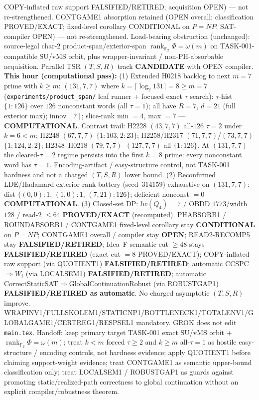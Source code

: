\documentclass[11pt]{article}
\begin{document}
COPY-inflated raw support FALSIFIED/RETIRED; acquisition OPEN) --- not re-strengthened.
CONTGAME1 absorption retained (OPEN overall; classification PROVED/EXACT;
fixed-level corollary CONDITIONAL on $P=NP$; SAT-compiler OPEN) --- not re-strengthened.
Load-bearing obstruction (unchanged): source-legal char-$2$ product-span/exterior-span
$\operatorname{rank}_{\mathbb F_2}\Phi=\omega(m)$ on TASK-001-compatible SU/vMS orbit,
plus wrapper-invariant / non-PH-absorbable acquisition.
Parallel TSR $(T,S,R)$ track \textbf{CANDIDATE} with OPEN compiler.
\textbf{This hour (computational pass):}
(1) Extended H0218 backlog to next $m{=}7$ prime with $k{\ge}m$:
$(131,7,7)$ where $k=\lceil\log_2 131\rceil=8{\ge}m{=}7$
(\texttt{experiments/product\_span/} leaf runner + focused exact $\tau$ search):
$\tau$-hist $\{1{:}126\}$ over $126$ nonconstant words (all $\tau{=}1$);
all have $R{=}7$, $d{=}21$ (full exterior max); innov $[7]$;
slice-rank min $=4$, max $=7$ --- \textbf{COMPUTATIONAL}.
Contrast trail: H2228 $(43,7,7)$ all-$126$ $\tau{=}2$ under $k{=}6{<}m$;
H2248 $(67,7,7)$ $\{1{:}103,2{:}23\}$; H2258/H2317 $(71,7,7)$/$(73,7,7)$ $\{1{:}124,2{:}2\}$;
H2348--H0218 $(79,7,7)$--$(127,7,7)$ all $\{1{:}126\}$.
At $(131,7,7)$ the cleared-$\tau{=}2$ regime persists into the first $k{=}8$ prime:
every nonconstant word has $\tau{=}1$. Encoding-artifact / easy-structure control,
not TASK-001 hardness and not a charged $(T,S,R)$ lower bound.
(2) Reconfirmed LDE/Hadamard exterior-rank battery (seed~$314159$) exhaustive on
$(131,7,7)$: dist $\{(0,0){:}1,\,(1,0){:}1,\,(7,21){:}126\}$; deficient nonconst $=0$ ---
\textbf{COMPUTATIONAL}.
(3) Closed-set DP: $lw(Q_4)=7$ / OBDD $1773$/width $128$ / read-$2$ $\le64$
\textbf{PROVED/EXACT} (recomputed).
PHABSORB1 / ROUNDABSORB1 / CONTGAME1 fixed-level corollary stay \textbf{CONDITIONAL} on $P=NP$;
CONTGAME1 overall / compiler stay \textbf{OPEN}; READ2-RECOMP5 stay \textbf{FALSIFIED/RETIRED};
Idea~F semantic-cut $\ge48$ stays \textbf{FALSIFIED/RETIRED} (exact cut $=8$ PROVED/EXACT);
COPY-inflated raw support (via QUOTIENT1) \textbf{FALSIFIED/RETIRED};
automatic CCSPC$\Rightarrow W_i$ (via LOCALSEM1) \textbf{FALSIFIED/RETIRED};
automatic CorrectStaticSAT$\Rightarrow$GlobalContinuationRobust (via ROBUSTGAP1)
\textbf{FALSIFIED/RETIRED as automatic}.
No charged asymptotic $(T,S,R)$ improve.
WRAPINV1/FULLSKOLEM1/STATICNP1/BOTTLENECK1/TOTALENV1/GLOBALGAME1/CERTREG1/RESPSEL1 mandatory.
GROK does not edit \texttt{main.tex}.
Handoff: keep primary target TASK-001 exact SU/vMS orbit + $\operatorname{rank}_{\mathbb F_2}\Phi=\omega(m)$;
treat $k{<}m$ forced $\tau{\ge}2$ and $k{\ge}m$ all-$\tau{=}1$ as hostile easy-structure /
encoding controls, not hardness evidence; apply QUOTIENT1 before claiming support-weight
evidence; treat CONTGAME1 as semantic upper-bound classification only; treat LOCALSEM1 /
ROBUSTGAP1 as guards against promoting static/realized-path correctness to global
continuation without an explicit compiler/robustness theorem.
\end{document}
